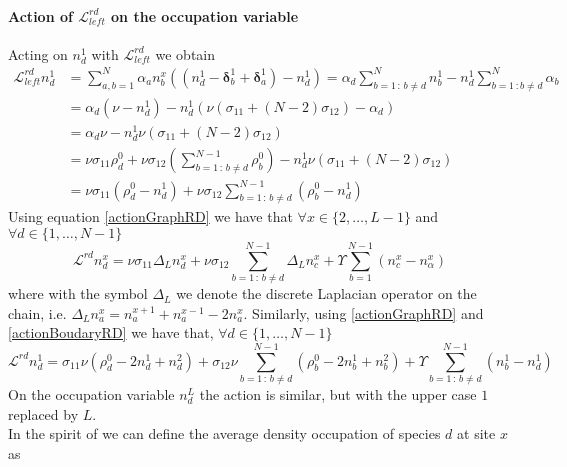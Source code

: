 \documentclass[10pt]{article}
\numberwithin{equation}{section}
\numberwithin{equation}{subsection}
\begin{document}
\paragraph{Action of $\mathcal{L}_{left}^{rd}$ on the occupation variable}
Acting on $n_{d}^{1}$  with $\mathcal{L}_{left}^{rd}$ we obtain
\begin{equation}\label{actionBoudaryRD}
	\begin{split}
		\mathcal{L}_{left}^{rd}n_{d}^{1}&=\sum_{a,b=1}^{N}\alpha_{a}n_{b}^{x}\left((n_{d}^{1}-\bm{\delta}_{b}^{1}+\bm{\delta}_{a}^{1})-n_{d}^{1}\right)=\alpha_{d}\sum_{b=1\,:\,b\neq d}^{N}n_{b}^{1}-n_{d}^{1}\sum_{b=1\,:b\neq d}^{N}\alpha_{b}
		\\&=
		\alpha_{d}\left(\nu-n_{d}^{1}\right)-n_{d}^{1}\left(\nu(\sigma_{11}+(N-2)\sigma_{12})-\alpha_{d}\right)
		\\&=\alpha_{d}\nu-n_{d}^{1}\nu(\sigma_{11}+(N-2)\sigma_{12})
		\\&=
		\nu\sigma_{11}\rho_{d}^{0}+\nu\sigma_{12}\left(\sum_{b=1\,:\,b\neq d}^{N-1}\rho_{b}^{0}\right)-n_{d}^{1}\nu(\sigma_{11}+(N-2)\sigma_{12})
		\\&=
		\nu \sigma_{11} (\rho_{d}^{0}-n_{d}^{1})+\nu\sigma_{12}\sum_{b=1\,:\,b\neq d}^{N-1}(\rho_{b}^{0}-n_{d}^{1})
	\end{split}
\end{equation}
Using equation \eqref{actionGraphRD} we have that $\forall x\in \{2,\ldots,L-1\}$ and $\forall d\in\{1,\ldots,N-1\}$
\begin{equation}\label{DifferenceEquation}
	\mathcal{L}^{rd}n_{d}^{x}=\nu\sigma_{11}\Delta_{L}n_{d}^{x}+\nu\sigma_{12}\sum_{b=1\,:\,b\neq d}^{N-1}\Delta_{L}n_{c}^{x}+\Upsilon\sum_{b=1}^{N-1}(n_{c}^{x}-n_{\alpha}^{x})
\end{equation}
where with the symbol $\Delta_{L}$ we denote the discrete Laplacian operator on the chain, i.e. $\Delta_{L}n_{a}^{x}=n_{a}^{x+1}+n_{a}^{x-1}-2n_{a}^{x}$.
Similarly, using \eqref{actionGraphRD}  and \eqref{actionBoudaryRD} we have that, $\forall d\in \{1,\ldots,N-1\}$ 
\begin{equation}\label{actionBDLine}
	\mathcal{L}^{rd}n_{d}^{1}=\sigma_{11}\nu \left(\rho_{d}^{0}-2n_{d}^{1}+n_{d}^{2}\right)+\sigma_{12}\nu\sum_{b=1\,:\,b\neq d}^{N-1}\left(\rho_{b}^{0}-2n_{b}^{1}+n_{b}^{2}\right)+\Upsilon\sum_{b=1\,:\,b\neq d}^{N-1}\left(n_{b}^{1}-n_{d}^{1}\right)
\end{equation}
On the occupation variable $n_{d}^{L}$ the action is similar, but with the upper case $1$ replaced by $L$.\\ In the spirit of \cite{casini2022uphill} we can define the average density occupation of species $d$ at site $x$ as
\end{document}
